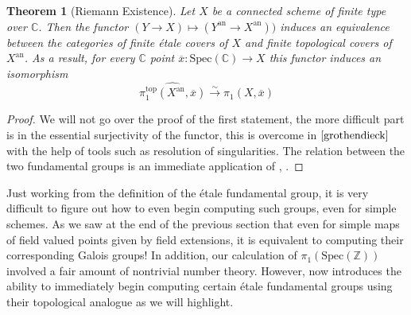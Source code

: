 \documentclass{article}
\newtheorem{theorem}{Theorem}[section]
\theoremstyle{definition}
\theoremstyle{remark}
\theoremstyle{plain}
\newcommand{\C}{\mathbb{C}}
\newcommand{\Z}{\mathbb{Z}}
\begin{document}
\begin{theorem}[Riemann Existence]
	Let $X$ be a connected scheme of finite type over $\C$.
	Then the functor $(Y \to X) \mapsto (Y^{\text{an}} \to X^{\text{an}}))$ induces an equivalence between the categories of finite \'etale covers of $X$ and finite topological covers of $X^{\text{an}}$.
	As a result, for every $\C$ point $\overline{x}: \text{Spec}(\C) \to X$ this functor induces an isomorphism
	\[\widehat{\pi_1^{\text{top}}(X^{\text{an}}, \overline{x})} \xrightarrow{\sim} \pi_1(X, \overline{x})\]
\end{theorem}

\begin{proof}
	We will not go over the proof of the first statement, the more difficult part is in the essential surjectivity of the functor, this is overcome in $\cite{grothendieck}$ with the help of tools such as resolution of singularities.
	The relation between the two fundamental groups is an immediate application of , .
\end{proof}

Just working from the definition of the \'etale fundamental group, it is very difficult to figure out how to even begin computing such groups, even for simple schemes. 
As we saw at the end of the previous section that even for simple maps of field valued points given by field extensions, it is equivalent to computing their corresponding Galois groups!
In addition, our calculation of $\pi_1(\text{Spec}(\Z))$ involved a fair amount of nontrivial number theory.
However,  now introduces the ability to immediately begin computing certain \'etale fundamental groups using their topological analogue as we will highlight.
\end{document}
